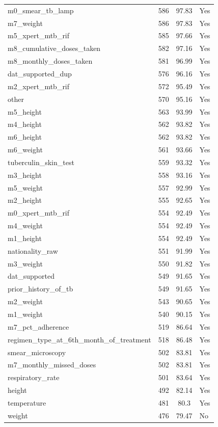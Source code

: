 \begin{longtable}[l]{>{\raggedright\arraybackslash}p{}cc>{\centering\arraybackslash}p{}}
m0\_smear\_tb\_lamp & 586 & 97.83 & Yes \\
m7\_weight & 586 & 97.83 & Yes \\
m5\_xpert\_mtb\_rif & 585 & 97.66 & Yes \\
m8\_cumulative\_doses\_taken & 582 & 97.16 & Yes \\
m8\_monthly\_doses\_taken & 581 & 96.99 & Yes \\
dat\_supported\_dup & 576 & 96.16 & Yes \\
m2\_xpert\_mtb\_rif & 572 & 95.49 & Yes \\
other & 570 & 95.16 & Yes \\
m5\_height & 563 & 93.99 & Yes \\
m4\_height & 562 & 93.82 & Yes \\
m6\_height & 562 & 93.82 & Yes \\
m6\_weight & 561 & 93.66 & Yes \\
tuberculin\_skin\_test & 559 & 93.32 & Yes \\
m3\_height & 558 & 93.16 & Yes \\
m5\_weight & 557 & 92.99 & Yes \\
m2\_height & 555 & 92.65 & Yes \\
m0\_xpert\_mtb\_rif & 554 & 92.49 & Yes \\
m4\_weight & 554 & 92.49 & Yes \\
m1\_height & 554 & 92.49 & Yes \\
nationality\_raw & 551 & 91.99 & Yes \\
m3\_weight & 550 & 91.82 & Yes \\
dat\_supported & 549 & 91.65 & Yes \\
prior\_history\_of\_tb & 549 & 91.65 & Yes \\
m2\_weight & 543 & 90.65 & Yes \\
m1\_weight & 540 & 90.15 & Yes \\
m7\_pct\_adherence & 519 & 86.64 & Yes \\
regimen\_type\_at\_6th\_month\_of\_treatment & 518 & 86.48 & Yes \\
smear\_microscopy & 502 & 83.81 & Yes \\
m7\_monthly\_missed\_doses & 502 & 83.81 & Yes \\
respiratory\_rate & 501 & 83.64 & Yes \\
height & 492 & 82.14 & Yes \\
temperature & 481 & 80.3 & Yes \\
weight & 476 & 79.47 & No \\

\end{longtable}
